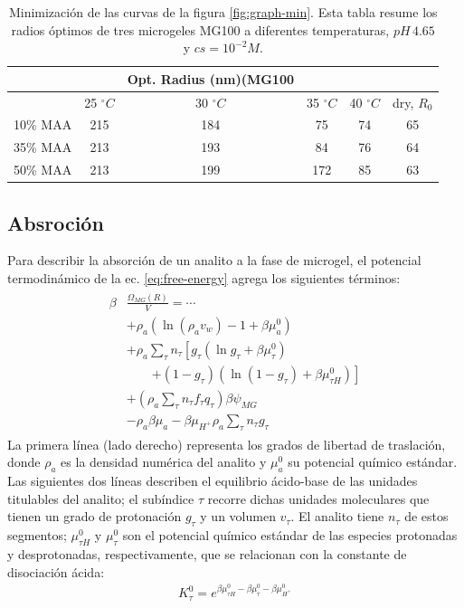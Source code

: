 \begin{table}[!htb]
\centering
\small
  \begin{tabular}{|lccccc|}
   \hline %
    	&&   Opt. Radius (nm)(MG100 & && \\
    	\hline
      & {25 $^\circ C$} & {30 $^\circ C$} & {35 $^\circ C$} & {40 $^\circ C$} & {dry, $R_0$} \\
      \hline
    10\% MAA & 215 &  184 &  75  &  74 & 65\\
    35\% MAA &  213 &  193 &  84 & 76 & 64\\
    50\% MAA &  213 & 199 &  172 & 85 & 63\\
    \hline
  \end{tabular}
 \caption{Minimizaci\'on de las curvas de la  figura \ref{fig:graph-min}.
 	Esta tabla resume los radios \'optimos de tres microgeles MG100 a diferentes temperaturas, $pH\,4.65$ y $cs=10^{-2}M$.}
\label{table:optimal-R} 
\end{table}


\subsection{Absroci\'on}


Para describir la absorci\'on de un analito a la fase de microgel,
el potencial termodin\'amico de la ec. \ref{eq:free-energy} agrega los siguientes t\'erminos:
%
%
%
\begin{align}
\begin{aligned}
\beta&\frac{\Omega_{MG}(R)}{V}= \cdots\\&+ \rho_a\left(\ln\left(\rho_a v_w\right) -1 + \beta\mu^0_a\right) \\
& + \rho_a \sum_\tau n_\tau  \left[g_\tau(\ln g_\tau+ \beta\mu^0_{\tau})\right.\\
&\qquad\left.+(1-g_\tau)(\ln (1-g_\tau)+\beta\mu^0_{\tau H})\right] \\
& +  \left( \rho_a \sum_\tau n_\tau f_\tau q_\tau\right)\beta\psi_{MG}\\
& -\rho_a\beta\mu_a
 -\beta\mu_{H^+} \rho_a \sum_\tau n_\tau g_\tau
\end{aligned}
\label{eq:ads}
\end{align}
%
\noindent La primera l\'inea (lado derecho) representa los grados de libertad de traslaci\'on,
donde $\rho_a$ es la densidad num\'erica del analito y $\mu_a^0$ su potencial qu\'imico est\'andar.
Las siguientes dos l\'ineas describen el equilibrio \'acido-base de las unidades titulables del analito;
el sub\'indice $\tau$ recorre dichas unidades moleculares que tienen un grado de protonaci\'on $g_\tau$ y un volumen $v_\tau$.
El analito tiene $n_\tau$ de estos segmentos;
$\mu^0_{\tau H}$ y $\mu^0_\tau$ son el potencial qu\'imico est\'andar de las especies protonadas y desprotonadas, respectivamente, que se relacionan con la constante de disociaci\'on \'acida:
%
\begin{align}
K^0_{\tau}= e^{\beta\mu^0_{\tau H}-\beta\mu^0_{\tau}-\beta\mu^0_{H^+}}
\end{align}
%

